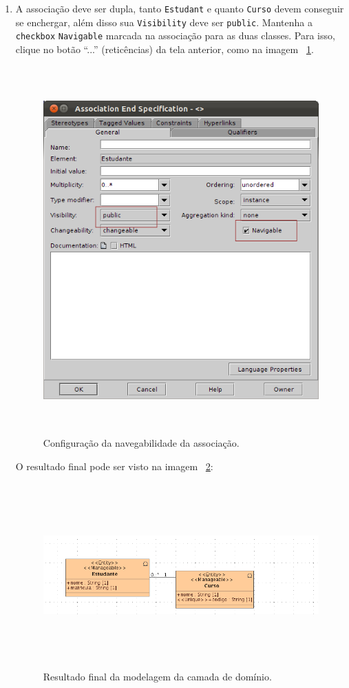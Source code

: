 \begin{enumerate}
\item A associação deve ser dupla, tanto \texttt{Estudant} e quanto
\texttt{Curso} devem conseguir se enchergar, além disso sua \texttt{Visibility}
deve ser \texttt{public}. Mantenha a \texttt{checkbox} \texttt{Navigable}
marcada na associação para as duas classes. Para isso, clique no botão “...”
(reticências) da tela anterior, como na imagem
~\ref{config_navigable_associacao}.
\begin{figure}[H]
	\centering
	\includegraphics[width=350pt,height=400pt]{imgs/tutorial-mdarte-0006.png}
	\caption{Configuração da navegabilidade da associação.}
	\label{config_navigable_associacao}
\end{figure}
		
O resultado final pode ser visto na imagem ~\ref{resultado_diagrama_classe}:
\hfill

\begin{figure}[H]
	\centering
	\includegraphics[width=500pt,height=200pt]{imgs/tutorial-mdarte-0007.png}
	\caption{Resultado final da modelagem da camada de domínio.}
	\label{resultado_diagrama_classe}
\end{figure}
	

\end{enumerate}
